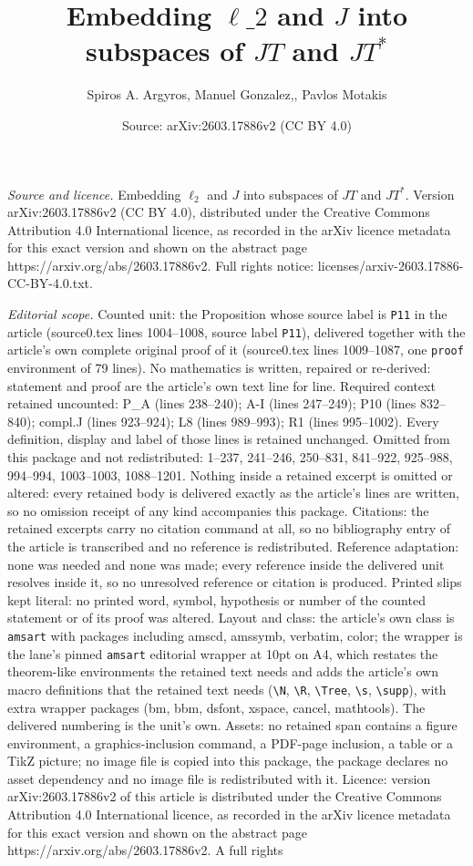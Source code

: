 \documentclass[10pt,a4paper]{amsart}
\title[Embedding $\ell\_2$ and $J$ into subspaces of $JT$ and $JT^*$]{Embedding $\ell\_2$ and $J$ into subspaces of $JT$ and $JT^*$}
\author{Spiros A. Argyros, Manuel Gonzalez,, Pavlos Motakis}
\date{Source: arXiv:2603.17886v2 (CC BY 4.0)}
\begin{document}
\maketitle

\noindent\emph{Source and licence.} Embedding $\ell_2$ and $J$ into subspaces of $JT$ and $JT^*$. Version arXiv:2603.17886v2 (CC BY 4.0), distributed under the Creative Commons Attribution 4.0 International licence, as recorded in the arXiv licence metadata for this exact version and shown on the abstract page https://arxiv.org/abs/2603.17886v2. Full rights notice: licenses/arxiv-2603.17886-CC-BY-4.0.txt.\par\smallskip

\noindent\textit{Editorial scope.} Counted unit: the Proposition whose source label is \texttt{P11} in the article (source0.tex lines 1004--1008, source label \texttt{P11}), delivered together with the article's own complete original proof of it (source0.tex lines 1009--1087, one \texttt{proof} environment of 79 lines). No mathematics is written, repaired or re-derived: statement and proof are the article's own text line for line. Required context retained uncounted: P\_A (lines 238--240); A-I (lines 247--249); P10 (lines 832--840); compl.J (lines 923--924); L8 (lines 989--993); R1 (lines 995--1002). Every definition, display and label of those lines is retained unchanged. Omitted from this package and not redistributed: 1--237, 241--246, 250--831, 841--922, 925--988, 994--994, 1003--1003, 1088--1201. Nothing inside a retained excerpt is omitted or altered: every retained body is delivered exactly as the article's lines are written, so no omission receipt of any kind accompanies this package. Citations: the retained excerpts carry no citation command at all, so no bibliography entry of the article is transcribed and no reference is redistributed. Reference adaptation: none was needed and none was made; every reference inside the delivered unit resolves inside it, so no unresolved reference or citation is produced. Printed slips kept literal: no printed word, symbol, hypothesis or number of the counted statement or of its proof was altered. Layout and class: the article's own class is \texttt{amsart} with packages including amscd, amssymb, verbatim, color; the wrapper is the lane's pinned \texttt{amsart} editorial wrapper at 10pt on A4, which restates the theorem-like environments the retained text needs and adds the article's own macro definitions that the retained text needs (\texttt{\textbackslash N}, \texttt{\textbackslash R}, \texttt{\textbackslash Tree}, \texttt{\textbackslash s}, \texttt{\textbackslash supp}), with extra wrapper packages (bm, bbm, dsfont, xspace, cancel, mathtools). The delivered numbering is the unit's own. Assets: no retained span contains a figure environment, a graphics-inclusion command, a PDF-page inclusion, a table or a TikZ picture; no image file is copied into this package, the package declares no asset dependency and no image file is redistributed with it. Licence: version arXiv:2603.17886v2 of this article is distributed under the Creative Commons Attribution 4.0 International licence, as recorded in the arXiv licence metadata for this exact version and shown on the abstract page https://arxiv.org/abs/2603.17886v2. A full rights 
\end{document}
